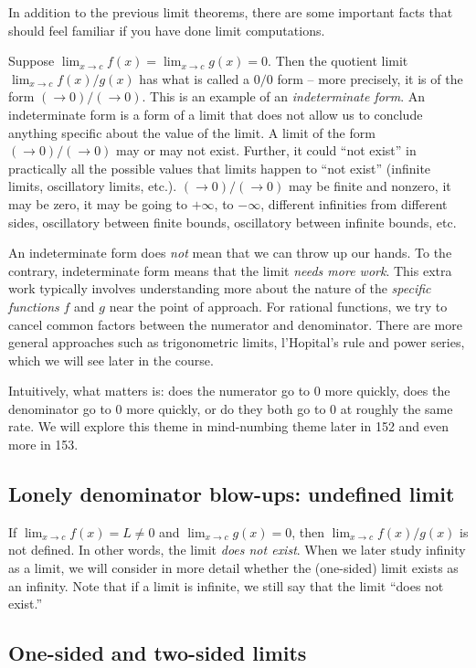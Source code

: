 \documentclass[10pt]{amsart}
\begin{document}
In addition to the previous limit theorems, there are some important
facts that should feel familiar if you have done limit computations.

Suppose $\lim_{x \to c} f(x) = \lim_{x \to c} g(x) = 0$. Then the
quotient limit $\lim_{x \to c} f(x)/g(x)$ has what is called a $0/0$
form -- more precisely, it is of the form $(\to 0)/(\to 0)$. This is
an example of an {\em indeterminate form}. An indeterminate form is a
form of a limit that does not allow us to conclude anything specific
about the value of the limit. A limit of the form $(\to 0)/(\to 0)$
may or may not exist. Further, it could ``not exist'' in practically
all the possible values that limits happen to ``not exist'' (infinite
limits, oscillatory limits, etc.). $(\to 0)/(\to 0)$ may be finite and
nonzero, it may be zero, it may be going to $+\infty$, to $-\infty$,
different infinities from different sides, oscillatory between finite
bounds, oscillatory between infinite bounds, etc.

An indeterminate form does {\em not} mean that we can throw up our
hands. To the contrary, indeterminate form means that the limit {\em
needs more work}. This extra work typically involves understanding
more about the nature of the {\em specific functions} $f$ and $g$ near
the point of approach. For rational functions, we try to cancel common
factors between the numerator and denominator. There are more general
approaches such as trigonometric limits, l'Hopital's rule and power
series, which we will see later in the course.

Intuitively, what matters is: does the numerator go to $0$ more
quickly, does the denominator go to $0$ more quickly, or do they both
go to $0$ at roughly the same rate. We will explore this theme in
mind-numbing theme later in 152 and even more in 153.

\subsection{Lonely denominator blow-ups: undefined limit}

If $\lim_{x \to c} f(x) = L \ne 0$ and $\lim_{x \to c} g(x) = 0$, then
$\lim_{x \to c} f(x)/g(x)$ is not defined. In other words, the limit
{\em does not exist}. When we later study infinity as a limit, we will
consider in more detail whether the (one-sided) limit exists as an
infinity. Note that if a limit is infinite, we still say that the
limit ``does not exist.''

\subsection{One-sided and two-sided limits}
\end{document}
